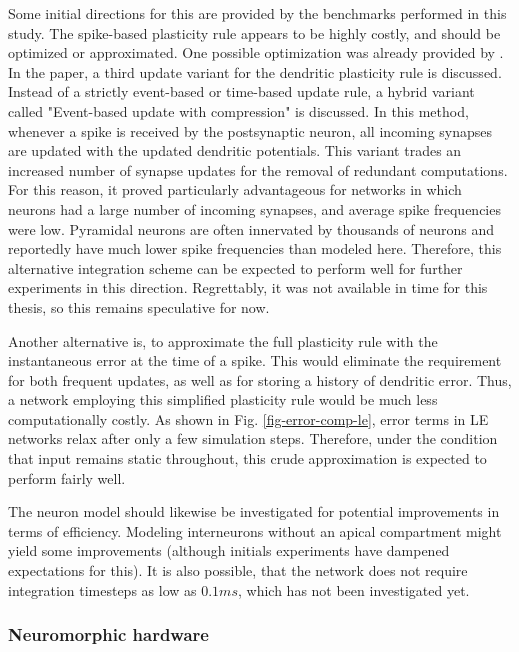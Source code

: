 Some initial directions for this are provided by the benchmarks performed in this study. The spike-based plasticity rule
appears to be highly costly, and should be optimized or approximated. One possible optimization was already provided by
\citep{Stapmanns2021}. In the paper, a third update variant for the dendritic plasticity rule is discussed. Instead of a
strictly event-based or time-based update rule, a hybrid variant called "Event-based update with compression" is
discussed. In this method, whenever a spike is received by the postsynaptic neuron, all incoming synapses are updated
with the updated dendritic potentials. This variant trades an increased number of synapse updates for the removal of
redundant computations. For this reason, it proved particularly advantageous for networks in which neurons had a large
number of incoming synapses, and average spike frequencies were low. Pyramidal neurons are often innervated by thousands
of neurons \citeme and reportedly have much lower spike frequencies than modeled here. Therefore, this alternative
integration scheme can be expected to perform well for further experiments in this direction. Regrettably, it was not
available in time for this thesis, so this remains speculative for now.

Another alternative is, to approximate the full plasticity rule with the instantaneous error at the time of a spike.
This would eliminate the requirement for both frequent updates, as well as for storing a history of dendritic error.
Thus, a network employing this simplified plasticity rule would be much less computationally costly. As shown in Fig.
\ref{fig-error-comp-le}, error terms in LE networks relax after only a few simulation steps. Therefore, under the
condition that input remains static throughout, this crude approximation is expected to perform fairly well. \newline

\noindent The neuron model should likewise be investigated for potential improvements in terms of efficiency. Modeling
interneurons without an apical compartment might yield some improvements (although initials experiments have dampened
expectations for this). It is also possible, that the network does not require integration timesteps as low as $0.1ms$,
which has not been investigated yet. \newline

\subsubsection*{Neuromorphic hardware}

